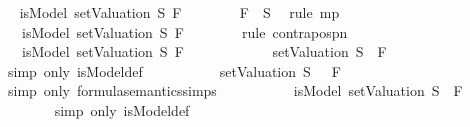 \begin{isabellebody}
\ \isamarkupfalse%
\ {\isachardoublequoteopen}isModel\ {\isacharparenleft}setValuation\ S{\isacharparenright}\ F{\isachardoublequoteclose}\isanewline
\ \ \ \ \ \ \isamarkupfalse%
\ {\isacartoucheopen}F\ {\isasymin}\ S{\isacartoucheclose}\ \isamarkupfalse%
\ {\isacharparenleft}rule\ mp{\isacharparenright}\isanewline
\ \ \ \ \isamarkupfalse%
\ \isamarkupfalse%
\ {\isachardoublequoteopen}{\isacharparenleft}{\isasymnot}\ {\isacharparenleft}{\isasymnot}\ isModel\ {\isacharparenleft}setValuation\ S{\isacharparenright}\ F{\isacharparenright}{\isacharparenright}{\isachardoublequoteclose}\isanewline
\ \ \ \ \ \ \isamarkupfalse%
\ {\isacharparenleft}rule\ contrapos{\isacharunderscore}pn{\isacharparenright}\isanewline
\ \ \ \ \isamarkupfalse%
\ \isamarkupfalse%
\ {\isachardoublequoteopen}{\isacharparenleft}{\isasymnot}\ {\isacharparenleft}{\isasymnot}\ isModel\ {\isacharparenleft}setValuation\ S{\isacharparenright}\ F{\isacharparenright}{\isacharparenright}\ {\isacharequal}\ \isanewline
\ \ \ \ \ \ \ \ {\isacharparenleft}{\isasymnot}\ {\isacharparenleft}{\isasymnot}\ {\isacharparenleft}setValuation\ S{\isacharparenright}\ {\isasymTurnstile}\ F{\isacharparenright}{\isacharparenright}{\isachardoublequoteclose}\isanewline
\ \ \ \ \ \ \isamarkupfalse%
\ {\isacharparenleft}simp\ only{\isacharcolon}\ isModel{\isacharunderscore}def{\isacharparenright}\isanewline
\ \ \ \ \isamarkupfalse%
\ \isamarkupfalse%
\ {\isachardoublequoteopen}{\isasymdots}\ {\isacharequal}\ {\isacharparenleft}{\isasymnot}\ {\isacharparenleft}setValuation\ S{\isacharparenright}\ {\isasymTurnstile}\ {\isacharparenleft}\isactrlbold {\isasymnot}\ F{\isacharparenright}{\isacharparenright}{\isachardoublequoteclose}\isanewline
\ \ \ \ \ \ \isamarkupfalse%
\ {\isacharparenleft}simp\ only{\isacharcolon}\ formula{\isacharunderscore}semantics{\isachardot}simps{\isacharparenleft}{}{\isacharparenright}{\isacharparenright}\isanewline
\ \ \ \ \isamarkupfalse%
\ \isamarkupfalse%
\ {\isachardoublequoteopen}{\isasymdots}\ {\isacharequal}\ {\isacharparenleft}{\isasymnot}\ isModel\ {\isacharparenleft}setValuation\ S{\isacharparenright}\ {\isacharparenleft}\isactrlbold {\isasymnot}\ F{\isacharparenright}{\isacharparenright}{\isachardoublequoteclose}\isanewline
\ \ \ \ \ \ \isamarkupfalse%
\ {\isacharparenleft}simp\ only{\isacharcolon}\ isModel{\isacharunderscore}def{\isacharparenright}\isanewline

\end{isabellebody}
